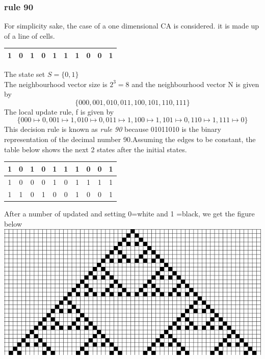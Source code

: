 \documentclass[24 pts]{article}
\begin{document}
\subsubsection{rule 90}
For simplicity sake, the case of a one dimensional CA is considered. it is made up of a line of cells.
\begin{center}
\begin{tabular}
{|c | c || c  | c | c || c | c | c | c | c | }
\hline
1 & 0 & 1 & 0 & 1 & 1 & 1 & 0 & 0 & 1 \\
\hline
\end{tabular}
\end{center}
The state set $S =\{0,1\}$\\
The neighbourhood vector size is $2^3=8$ and the neighbourhood vector N is given by $$\{000,001,010,011,100,101,110,111\}$$
The local update rule, f is given by 
$$\{000\mapsto 0,001\mapsto 1,010\mapsto 0,011\mapsto 1,100\mapsto 1,101\mapsto 0,110\mapsto 1,111\mapsto 0\}$$
This decision rule is known as \textit{rule 90} because 01011010 is the binary representation of the decimal number 90.Assuming the edges to be constant, the table below shows the next 2 states after the initial states. 
\begin{center}
\begin{tabular}
{|c | c | c  | c | c | c | c | c | c | c | }
\hline
1 & 0 & 1 & 0 & 1 & 1 & 1 & 0 & 0 & 1 \\
\hline
1 & 0 & 0 & 0 & 1 & 0 & 1 & 1 & 1 & 1 \\
\hline
1 & 1 & 0 & 1 & 0 & 0 & 1 & 0 & 0 & 1 \\
\hline
\end{tabular}
\end{center}
After a number of updated and setting 0=white and 1 =black, we get the figure below\\
\includegraphics[scale =0.3]{Rule90}\\
\end{document}
